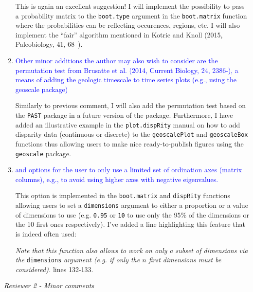 \documentclass[12pt,letterpaper]{article}
\renewcommand{\subsection}[1]{%
\bigskip
\begin{center}
\begin{large}
\normalfont\itshape #1
\end{large}
\end{center}}
\begin{document}
\begin{enumerate}
This is again an excellent suggestion!
I will implement the possibility to pass a probability matrix to the \texttt{boot.type} argument in the \texttt{boot.matrix} function where the probabilities can be reflecting occurences, regions, etc.
I will also implement the ``fair'' algorithm mentioned in Kotric and Knoll (2015, Paleobiology, 41, 68–).

\item{\textcolor{blue}{Other minor additions the author may also wish to consider are the permutation test from Brusatte et al. (2014, Current Biology, 24, 2386-), a means of adding the geologic timescale to time series plots (e.g., using the geoscale package)}}

Similarly to previous comment, I will also add the permutation test based on the \texttt{PAST} package in a future version of the package.
Furthermore, I have added an illustrative example in the \texttt{plot.dispRity} manual on how to add disparity data (continuous or discrete) to the \texttt{geoscalePlot} and \texttt{geoscaleBox} functions thus allowing users to make nice ready-to-publish figures using the \texttt{geoscale} package.

\item{\textcolor{blue}{and options for the user to only use a limited set of ordination axes (matrix columns), e.g., to avoid using higher axes with negative eigenvalues.}}

This option is implemented in the \texttt{boot.matrix} and \texttt{dispRity} functions allowing users to set a \texttt{dimensions} argument to either a proportion or a value of dimensions to use (e.g. \texttt{0.95} or \texttt{10} to use only the 95\% of the dimensions or the 10 first ones respectively). I've added a line highlighting this feature that is indeed often used:

\textit{Note that this function also allows to work on only a subset of dimensions via the} \texttt{dimensions} \textit{argument (e.g. if only the $n$ first dimensions must be considered).} lines 132-133. 

\end{enumerate}

\subsection{Reviewer 2 - Minor comments}
\end{document}
